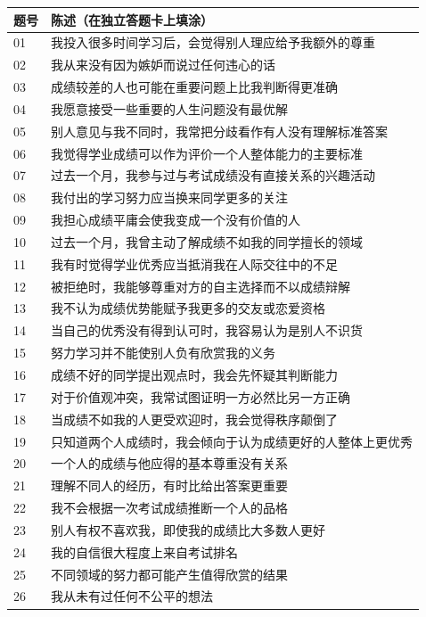 \documentclass[11pt,a4paper,UTF8,fontset=none]{ctexart}
\begin{document}
\begin{longtable}{@{}p{1.2cm}p{14.5cm}@{}}
\toprule 题号&陈述（在独立答题卡上填涂）\\\midrule\endhead
01&我投入很多时间学习后，会觉得别人理应给予我额外的尊重\\[3pt]
02&我从来没有因为嫉妒而说过任何违心的话\\[3pt]
03&成绩较差的人也可能在重要问题上比我判断得更准确\\[3pt]
04&我愿意接受一些重要的人生问题没有最优解\\[3pt]
05&别人意见与我不同时，我常把分歧看作有人没有理解标准答案\\[3pt]
06&我觉得学业成绩可以作为评价一个人整体能力的主要标准\\[3pt]
07&过去一个月，我参与过与考试成绩没有直接关系的兴趣活动\\[3pt]
08&我付出的学习努力应当换来同学更多的关注\\[3pt]
09&我担心成绩平庸会使我变成一个没有价值的人\\[3pt]
10&过去一个月，我曾主动了解成绩不如我的同学擅长的领域\\[3pt]
11&我有时觉得学业优秀应当抵消我在人际交往中的不足\\[3pt]
12&被拒绝时，我能够尊重对方的自主选择而不以成绩辩解\\[3pt]
13&我不认为成绩优势能赋予我更多的交友或恋爱资格\\[3pt]
14&当自己的优秀没有得到认可时，我容易认为是别人不识货\\[3pt]
15&努力学习并不能使别人负有欣赏我的义务\\[3pt]
16&成绩不好的同学提出观点时，我会先怀疑其判断能力\\[3pt]
17&对于价值观冲突，我常试图证明一方必然比另一方正确\\[3pt]
18&当成绩不如我的人更受欢迎时，我会觉得秩序颠倒了\\[3pt]
19&只知道两个人成绩时，我会倾向于认为成绩更好的人整体上更优秀\\[3pt]
20&一个人的成绩与他应得的基本尊重没有关系\\[3pt]
21&理解不同人的经历，有时比给出答案更重要\\[3pt]
22&我不会根据一次考试成绩推断一个人的品格\\[3pt]
23&别人有权不喜欢我，即使我的成绩比大多数人更好\\[3pt]
24&我的自信很大程度上来自考试排名\\[3pt]
25&不同领域的努力都可能产生值得欣赏的结果\\[3pt]
26&我从未有过任何不公平的想法\\[3pt]

\end{longtable}
\end{document}
